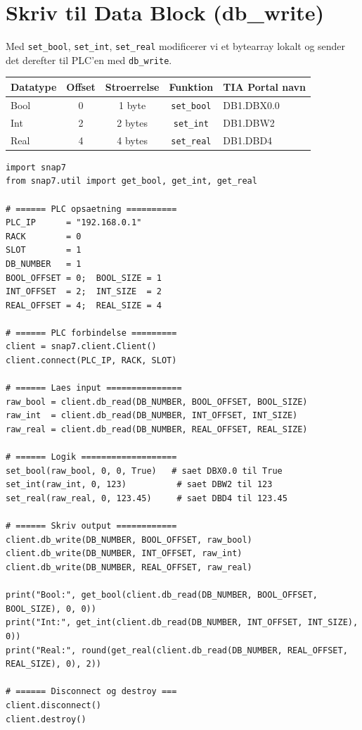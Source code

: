 \documentclass[12pt, a4paper]{article}
\begin{document}
\clearpage
\section{Skriv til Data Block (db\_write)}

Med \texttt{set\_bool}, \texttt{set\_int}, \texttt{set\_real} modificerer
vi et bytearray lokalt og sender det derefter til PLC'en med \texttt{db\_write}.

\begin{center}
\begin{tabular}{lcccp{4.5cm}}
\toprule
\textbf{Datatype} & \textbf{Offset} & \textbf{Stroerrelse} & \textbf{Funktion} & \textbf{TIA Portal navn} \\
\midrule
Bool & 0 & 1 byte & \texttt{set\_bool} & DB1.DBX0.0 \\
Int  & 2 & 2 bytes & \texttt{set\_int}  & DB1.DBW2 \\
Real & 4 & 4 bytes & \texttt{set\_real} & DB1.DBD4 \\
\bottomrule
\end{tabular}
\end{center}

\begin{tcolorbox}[pythonbox, title={\faPython\quad Kode 1 --- Skriv Bool, Int og Real til DB1}]
\begin{verbatim}
import snap7
from snap7.util import get_bool, get_int, get_real

# ====== PLC opsaetning ==========
PLC_IP      = "192.168.0.1"
RACK        = 0
SLOT        = 1
DB_NUMBER   = 1
BOOL_OFFSET = 0;  BOOL_SIZE = 1
INT_OFFSET  = 2;  INT_SIZE  = 2
REAL_OFFSET = 4;  REAL_SIZE = 4

# ====== PLC forbindelse =========
client = snap7.client.Client()
client.connect(PLC_IP, RACK, SLOT)

# ====== Laes input ===============
raw_bool = client.db_read(DB_NUMBER, BOOL_OFFSET, BOOL_SIZE)
raw_int  = client.db_read(DB_NUMBER, INT_OFFSET, INT_SIZE)
raw_real = client.db_read(DB_NUMBER, REAL_OFFSET, REAL_SIZE)

# ====== Logik ===================
set_bool(raw_bool, 0, 0, True)   # saet DBX0.0 til True
set_int(raw_int, 0, 123)          # saet DBW2 til 123
set_real(raw_real, 0, 123.45)     # saet DBD4 til 123.45

# ====== Skriv output ============
client.db_write(DB_NUMBER, BOOL_OFFSET, raw_bool)
client.db_write(DB_NUMBER, INT_OFFSET, raw_int)
client.db_write(DB_NUMBER, REAL_OFFSET, raw_real)

print("Bool:", get_bool(client.db_read(DB_NUMBER, BOOL_OFFSET, BOOL_SIZE), 0, 0))
print("Int:", get_int(client.db_read(DB_NUMBER, INT_OFFSET, INT_SIZE), 0))
print("Real:", round(get_real(client.db_read(DB_NUMBER, REAL_OFFSET, REAL_SIZE), 0), 2))

# ====== Disconnect og destroy ===
client.disconnect()
client.destroy()
\end{verbatim}
\end{tcolorbox}
\end{document}
